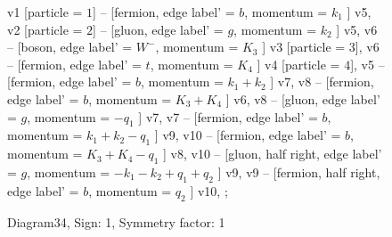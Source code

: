 \documentclass{revtex4}
\begin{document}
\begin{figure}[!htb]
\begin{center}
{    %
v1 [particle = \(1\)] -- [fermion, edge label' = \(b\), momentum = \(k_{1}\) ] v5, 
v2 [particle = \(2\)] -- [gluon, edge label' = \(g\), momentum = \(k_{2}\) ] v5, 
v6 -- [boson, edge label' = \(W^{-}\), momentum = \(K_{3}\) ] v3 [particle = \(3\)], 
v6 -- [fermion, edge label' = \(t\), momentum = \(K_{4}\) ] v4 [particle = \(4\)], 
v5 -- [fermion, edge label' = \(b\), momentum = \(k_{1} + k_{2}\) ] v7, 
v8 -- [fermion, edge label' = \(b\), momentum = \(K_{3} + K_{4}\) ] v6, 
v8 -- [gluon, edge label' = \(g\), momentum = \(-q_{1}\) ] v7, 
v7 -- [fermion, edge label' = \(b\), momentum = \(k_{1} + k_{2} - q_{1}\) ] v9, 
v10 -- [fermion, edge label' = \(b\), momentum = \(K_{3} + K_{4} - q_{1}\) ] v8, 
v10 -- [gluon, half right, edge label' = \(g\), momentum = \(-k_{1} - k_{2} + q_{1} + q_{2}\) ] v9, 
v9 -- [fermion, half right, edge label' = \(b\), momentum = \(q_{2}\) ] v10, 
};
\end{center}
\caption{Diagram34, Sign: 1, Symmetry factor: 1}
\end{figure}
\newpage
\end{document}
